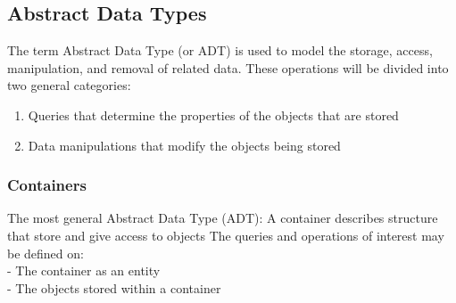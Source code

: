 \documentclass[11pt]{article}
\theoremstyle{definition}
\begin{document}
\subsection{Abstract Data Types}
The term Abstract Data Type (or ADT) is used to model the storage, access, manipulation, and removal of related data. These operations will be divided into two general categories:
\begin{enumerate}
    \item Queries that determine the properties of the objects that are stored
    \item Data manipulations that modify the objects being stored
\end{enumerate} 
\subsubsection{Containers}
The most general Abstract Data Type (ADT): A container describes structure that store and give access to objects
The queries and operations of interest may be defined on:\\
-  The container as an entity\\
-  The objects stored within a container
\end{document}
